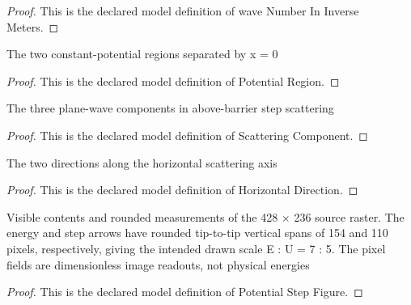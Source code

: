 \begin{proof}
  This is the declared model definition of wave Number In Inverse Meters.
\end{proof}
\begin{definition}
  \label{def:physics:phyx-mini-0534:phyxminiproblems-problemphyxmini0534-potentialregion}
  The two constant-potential regions separated by x = 0
\end{definition}
\begin{proof}
  This is the declared model definition of Potential Region.
\end{proof}
\begin{definition}
  \label{def:physics:phyx-mini-0534:phyxminiproblems-problemphyxmini0534-scatteringcomponent}
  The three plane-wave components in above-barrier step scattering
\end{definition}
\begin{proof}
  This is the declared model definition of Scattering Component.
\end{proof}
\begin{definition}
  \label{def:physics:phyx-mini-0534:phyxminiproblems-problemphyxmini0534-horizontaldirection}
  The two directions along the horizontal scattering axis
\end{definition}
\begin{proof}
  This is the declared model definition of Horizontal Direction.
\end{proof}
\begin{definition}
  \label{def:physics:phyx-mini-0534:phyxminiproblems-problemphyxmini0534-potentialstepfigure}
  Visible contents and rounded measurements of the 428 × 236 source raster. The energy and step arrows have rounded tip-to-tip vertical spans of 154 and 110 pixels, respectively, giving the intended drawn scale E : U = 7 : 5. The pixel fields are dimensionless image readouts, not physical energies
\end{definition}
\begin{proof}
  This is the declared model definition of Potential Step Figure.
\end{proof}

